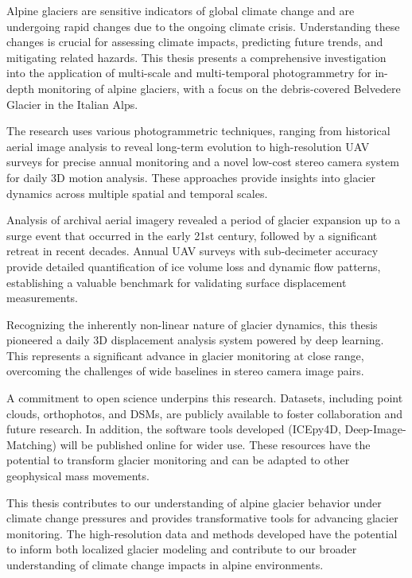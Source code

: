Alpine glaciers are sensitive indicators of global climate change and are undergoing rapid changes due to the ongoing climate crisis. 
Understanding these changes is crucial for assessing climate impacts, predicting future trends, and mitigating related hazards.  
This thesis presents a comprehensive investigation into the application of multi-scale and multi-temporal photogrammetry for in-depth monitoring of alpine glaciers, with a focus on the debris-covered Belvedere Glacier in the Italian Alps.

The research uses various photogrammetric techniques, ranging from historical aerial image analysis to reveal long-term evolution to high-resolution UAV surveys for precise annual monitoring and a novel low-cost stereo camera system for daily 3D motion analysis.
These approaches provide insights into glacier dynamics across multiple spatial and temporal scales.

Analysis of archival aerial imagery revealed a period of glacier expansion up to a surge event that occurred in the early 21st century, followed by a significant retreat in recent decades. 
Annual UAV surveys with sub-decimeter accuracy provide detailed quantification of ice volume loss and dynamic flow patterns, establishing a valuable benchmark for validating surface displacement measurements.

Recognizing the inherently non-linear nature of glacier dynamics, this thesis pioneered a daily 3D displacement analysis system powered by deep learning.  
This represents a significant advance in glacier monitoring at close range, overcoming the challenges of wide baselines in stereo camera image pairs.

A commitment to open science underpins this research.  
Datasets, including point clouds, orthophotos, and DSMs, are publicly available to foster collaboration and future research.  
In addition, the software tools developed (ICEpy4D, Deep-Image-Matching) will be published online for wider use. 
These resources have the potential to transform glacier monitoring and can be adapted to other geophysical mass movements.

This thesis contributes to our understanding of alpine glacier behavior under climate change pressures and provides transformative tools for advancing glacier monitoring. 
The high-resolution data and methods developed have the potential to inform both localized glacier modeling and contribute to our broader understanding of climate change impacts in alpine environments.